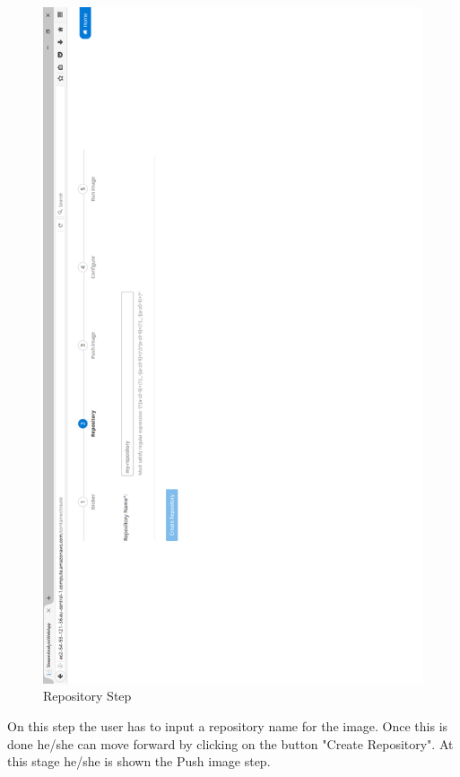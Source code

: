 \begin{figure}[p]
	\centering
	\noindent
	\includegraphics[width=0.5\paperwidth]{./images/guide/container/repository.PNG}
	\caption{Repository Step}
	\label{fig:repository}
\end{figure}

On this step the user has to input a repository name for the image. Once this is done he/she can move forward by clicking on the button "Create Repository". At this stage he/she is shown the Push image step.

